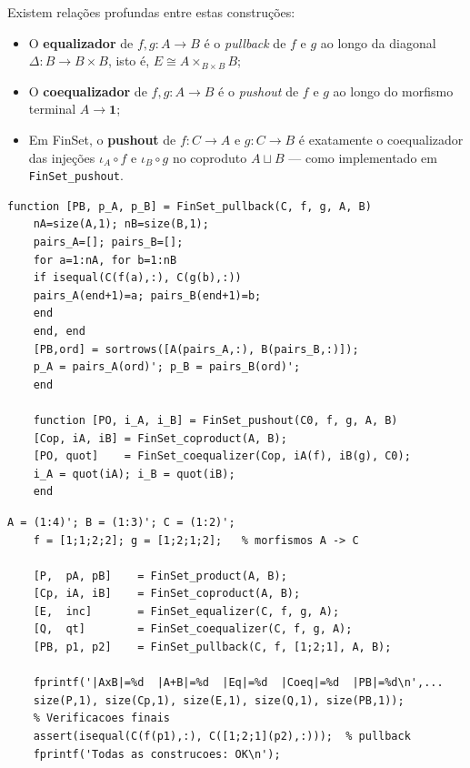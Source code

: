 \begin{remark}
	Existem relações profundas entre estas construções:
	\begin{itemize}
		\item O \textbf{equalizador} de $f,g: A \to B$ é o
		\emph{pullback} de $f$ e $g$ ao longo da diagonal
		$\Delta: B \to B \times B$, isto é,
		$E \cong A \times_{B \times B} B$;
		\item O \textbf{coequalizador} de $f,g: A \to B$ é o
		\emph{pushout} de $f$ e $g$ ao longo do morfismo
		terminal $A \to \mathbf{1}$;
		\item Em FinSet, o \textbf{pushout} de $f: C \to A$ e
		$g: C \to B$ é exatamente o coequalizador das
		injeções $\iota_A \circ f$ e $\iota_B \circ g$
		no coproduto $A \sqcup B$ --- como implementado
		em \texttt{FinSet\_pushout}.
	\end{itemize}
\end{remark}

\begin{lstlisting}[style=matlab, caption={Pullback e Pushout em FinSet}]
	function [PB, p_A, p_B] = FinSet_pullback(C, f, g, A, B)
	nA=size(A,1); nB=size(B,1);
	pairs_A=[]; pairs_B=[];
	for a=1:nA, for b=1:nB
	if isequal(C(f(a),:), C(g(b),:))
	pairs_A(end+1)=a; pairs_B(end+1)=b;
	end
	end, end
	[PB,ord] = sortrows([A(pairs_A,:), B(pairs_B,:)]);
	p_A = pairs_A(ord)'; p_B = pairs_B(ord)';
	end
	
	function [PO, i_A, i_B] = FinSet_pushout(C0, f, g, A, B)
	[Cop, iA, iB] = FinSet_coproduct(A, B);
	[PO, quot]    = FinSet_coequalizer(Cop, iA(f), iB(g), C0);
	i_A = quot(iA); i_B = quot(iB);
	end
\end{lstlisting}

\begin{lstlisting}[style=matlab, caption={Verificação integrada de todas as construções}]
	A = (1:4)'; B = (1:3)'; C = (1:2)';
	f = [1;1;2;2]; g = [1;2;1;2];   % morfismos A -> C
	
	[P,  pA, pB]    = FinSet_product(A, B);
	[Cp, iA, iB]    = FinSet_coproduct(A, B);
	[E,  inc]       = FinSet_equalizer(C, f, g, A);
	[Q,  qt]        = FinSet_coequalizer(C, f, g, A);
	[PB, p1, p2]    = FinSet_pullback(C, f, [1;2;1], A, B);
	
	fprintf('|AxB|=%d  |A+B|=%d  |Eq|=%d  |Coeq|=%d  |PB|=%d\n',...
	size(P,1), size(Cp,1), size(E,1), size(Q,1), size(PB,1));
	% Verificacoes finais
	assert(isequal(C(f(p1),:), C([1;2;1](p2),:)));  % pullback
	fprintf('Todas as construcoes: OK\n');
\end{lstlisting}

